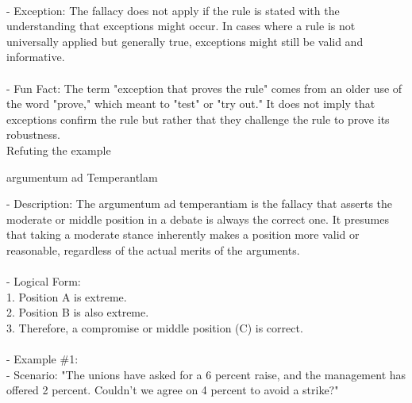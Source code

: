 \documentclass[a4paper,12pt,single,pdftex]{scrbook}
\begin{document}
    
      
    \\

    
      - Exception: The fallacy does not apply if the rule is stated with the understanding that exceptions might occur. In cases where a rule is not universally applied but generally true, exceptions might still be valid and informative.
    \\

    
      
    \\

    
      - Fun Fact: The term "exception that proves the rule" comes from an older use of the word "prove," which meant to "test" or "try out." It does not imply that exceptions confirm the rule but rather that they challenge the rule to prove its robustness.
    \\

  

Refuting the example

argumentum ad Temperantlam
    
      - Description: The argumentum ad temperantiam is the fallacy that asserts the moderate or middle position in a debate is always the correct one. It presumes that taking a moderate stance inherently makes a position more valid or reasonable, regardless of the actual merits of the arguments.
    \\

    
      
    \\

    
      - Logical Form: 
    \\

    
        1. Position A is extreme.
    \\

    
        2. Position B is also extreme.
    \\

    
        3. Therefore, a compromise or middle position (C) is correct.
    \\

    
      
    \\

    
      - Example \#1:
    \\

    
        - Scenario: "The unions have asked for a 6 percent raise, and the management has offered 2 percent. Couldn’t we agree on 4 percent to avoid a strike?"
    \\
\end{document}

